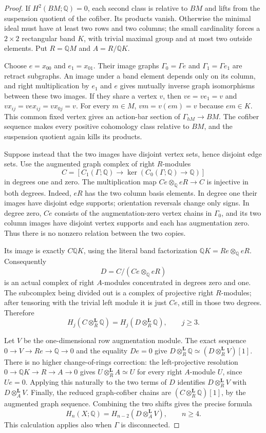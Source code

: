\begin{proof}
If $H^2(BM;\mathbb Q)=0$, each second class is relative
to $BM$ and lifts from the suspension quotient of the
cofiber.  Its products vanish.  Otherwise the minimal
ideal must have at least two rows and two columns;
the small cardinality forces a $2\times2$ rectangular
band $K$, with trivial maximal group and at most two
outside elements.  Put $R=\mathbb QM$ and
$A=R/\mathbb QK$.

Choose $e=x_{00}$ and $e_1=x_{01}$.  Their image graphs
$\Gamma_0=\Gamma e$ and $\Gamma_1=\Gamma e_1$ are
retract subgraphs.  An image under a band element depends
only on its column, and right multiplication by $e_1$
and $e$ gives mutually inverse graph isomorphisms between
these two images.  If they share a vertex $v$, then
$ve=ve_1=v$ and
$vx_{ij}=vex_{ij}=vx_{0j}=v$.  For every $m\in M$,
$vm=v(em)=v$ because $em\in K$.  This common fixed
vertex gives an action-bar section of
$\Gamma_{hM}\to BM$.  The cofiber sequence makes every
positive cohomology class relative to $BM$, and the
suspension quotient again kills its products.

Suppose instead that the two images have disjoint vertex
sets, hence disjoint edge sets.  Use the augmented graph
complex of right $R$-modules
\[
 C=[C_1(\Gamma;\mathbb Q)\longrightarrow
                  \ker(C_0(\Gamma;\mathbb Q)\to\mathbb Q)]
\]
in degrees one and zero.  The multiplication map
$Ce\otimes_{\mathbb Q}eR\to C$ is injective in both
degrees.  Indeed, $eR$ has the two column basis elements.
In degree one their images have disjoint edge supports;
orientation reversals change only signs.  In degree zero,
$Ce$ consists of the augmentation-zero vertex chains in
$\Gamma_0$, and its two column images have disjoint
vertex supports and each has augmentation zero.  Thus
there is no nonzero relation between the two copies.

Its image is exactly $C\mathbb QK$, using the literal
band factorization $\mathbb QK=Re\otimes_{\mathbb Q}eR$.
Consequently
\[
 D=C/(Ce\otimes_{\mathbb Q}eR)
\]
is an actual complex of right $A$-modules concentrated
in degrees zero and one.  The subcomplex being divided
out is a complex of projective right $R$-modules; after
tensoring with the trivial left module it is just $Ce$,
still in those two degrees.  Therefore
\[
 H_j(C\otimes_R^{\mathbf L}\mathbb Q)
  =H_j(D\otimes_R^{\mathbf L}\mathbb Q),\qquad j\geq3.
\]

Let $V$ be the one-dimensional row augmentation module.
The exact sequence $0\to V\to Re\to\mathbb Q\to0$
and the equality $De=0$ give
$D\otimes_R^{\mathbf L}\mathbb Q
 \simeq(D\otimes_R^{\mathbf L}V)[1]$.
There is no higher change-of-rings correction: the
left-projective resolution
$0\to\mathbb QK\to R\to A\to0$ gives
$U\otimes_R^{\mathbf L}A\simeq U$ for every right
$A$-module $U$, since $Ue=0$.  Applying this naturally
to the two terms of $D$ identifies
$D\otimes_R^{\mathbf L}V$ with
$D\otimes_A^{\mathbf L}V$.
Finally, the reduced graph-cofiber chains are
$(C\otimes_R^{\mathbf L}\mathbb Q)[1]$, by the
augmented graph sequence.  Combining the two shifts
gives the precise formula
\[
 H_n(X;\mathbb Q)
   =H_{n-2}(D\otimes_A^{\mathbf L}V),\qquad n\geq4.
\]
This calculation applies also when $\Gamma$ is disconnected.


\end{proof}
